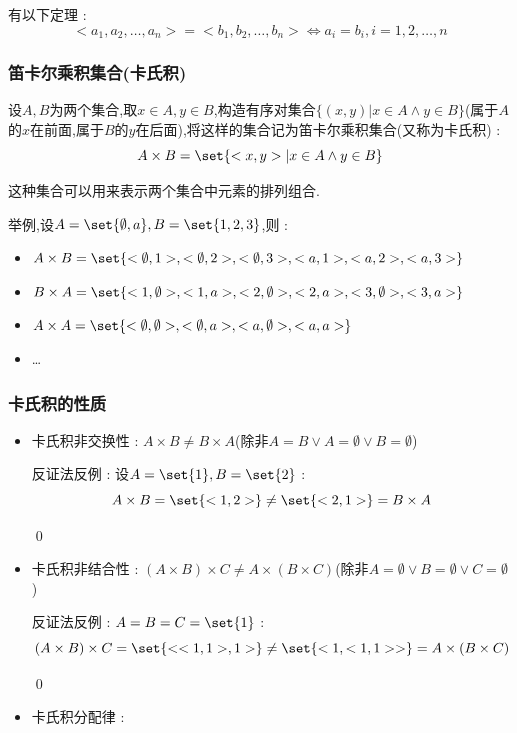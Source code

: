 {{{  有以下定理 : $$
    <a_1,a_2,\dots,a_n> = <b_1,b_2,\dots,b_n> \Leftrightarrow a_i = b_i,i = 1,2,\dots,n
  $$
}%

\subsubsection{笛卡尔乘积集合(卡氏积)}{
  设$A,B$为两个集合,取$x \in A,y \in B$,构造有序对集合$\{(x,y)| x \in A \land y \in B\}$(属于$A$的$x$在前面,属于$B$的$y$在后面),将这样的集合记为笛卡尔乘积集合(又称为卡氏积) : $$
    A \times B = \set{<x,y>|x \in A \land y \in B}
  $$

  这种集合可以用来表示两个集合中元素的排列组合.

  举例,设$A = \set{\emptyset,a},B = \set{1,2,3}$,则 :

  \begin{itemize}
    \item $A \times B = \set{<\emptyset,1>,<\emptyset,2>,<\emptyset,3>,<a,1>,<a,2>,<a,3>}$
    \item $B \times A = \set{<1,\emptyset>,<1,a>,<2,\emptyset>,<2,a>,<3,\emptyset>,<3,a>}$
    \item $A \times A = \set{<\emptyset,\emptyset>,<\emptyset,a>,<a,\emptyset>,<a,a>}$
    \item \dots
  \end{itemize}
}%

\subsubsection{卡氏积的性质}{
  \begin{itemize}
    \item {
          卡氏积非交换性 : $A \times B \neq B \times A$(除非$A = B \lor A = \emptyset \lor B = \emptyset$)

          反证法反例 : 设$A = \set{1},B = \set{2}$ : $$
            A \times B = \set{<1,2>} \neq \set{<2,1>} = B \times A
          $$

          \qed
          }
    \item {
          卡氏积非结合性 : $(A \times B) \times C \neq A \times (B \times C)$(除非$A = \emptyset \lor B = \emptyset \lor C = \emptyset$)

          反证法反例 : $A = B = C = \set{1}$ : $$
            (A \times B) \times C = \set{<<1,1>,1>} \neq \set{<1,<1,1>>} = A \times (B \times C)
          $$

          \qed
          }
    \item {
          卡氏积分配律 :

}
\end{itemize}}}}
